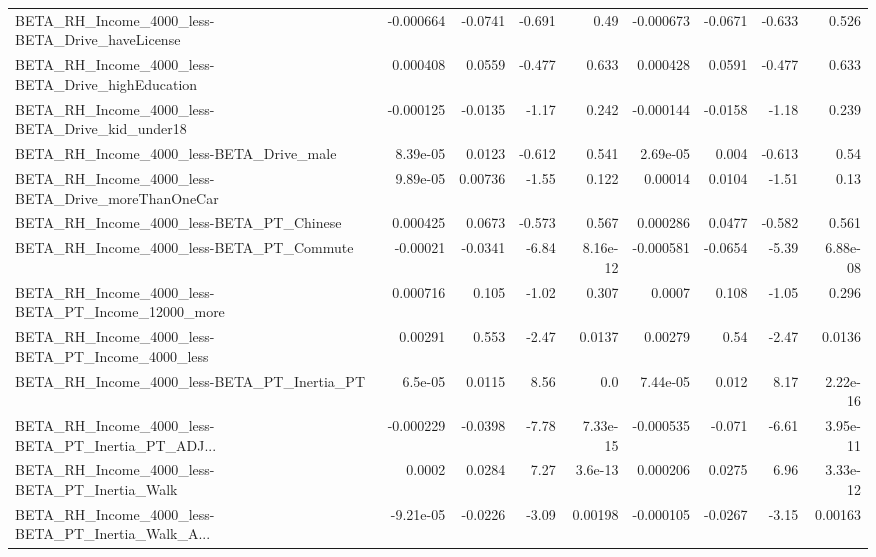 \begin{tabular}{lrrrrrrrr}
BETA\_RH\_Income\_4000\_less-BETA\_Drive\_haveLicense    &   -0.000664 &      -0.0741 &   -0.691 &     0.49 &  -0.000673 &     -0.0671 &       -0.633 &         0.526 \\
BETA\_RH\_Income\_4000\_less-BETA\_Drive\_highEducation  &    0.000408 &       0.0559 &   -0.477 &    0.633 &   0.000428 &      0.0591 &       -0.477 &         0.633 \\
BETA\_RH\_Income\_4000\_less-BETA\_Drive\_kid\_under18    &   -0.000125 &      -0.0135 &    -1.17 &    0.242 &  -0.000144 &     -0.0158 &        -1.18 &         0.239 \\
BETA\_RH\_Income\_4000\_less-BETA\_Drive\_male           &    8.39e-05 &       0.0123 &   -0.612 &    0.541 &   2.69e-05 &       0.004 &       -0.613 &          0.54 \\
BETA\_RH\_Income\_4000\_less-BETA\_Drive\_moreThanOneCar &    9.89e-05 &      0.00736 &    -1.55 &    0.122 &    0.00014 &      0.0104 &        -1.51 &          0.13 \\
BETA\_RH\_Income\_4000\_less-BETA\_PT\_Chinese           &    0.000425 &       0.0673 &   -0.573 &    0.567 &   0.000286 &      0.0477 &       -0.582 &         0.561 \\
BETA\_RH\_Income\_4000\_less-BETA\_PT\_Commute           &    -0.00021 &      -0.0341 &    -6.84 & 8.16e-12 &  -0.000581 &     -0.0654 &        -5.39 &      6.88e-08 \\
BETA\_RH\_Income\_4000\_less-BETA\_PT\_Income\_12000\_more &    0.000716 &        0.105 &    -1.02 &    0.307 &     0.0007 &       0.108 &        -1.05 &         0.296 \\
BETA\_RH\_Income\_4000\_less-BETA\_PT\_Income\_4000\_less  &     0.00291 &        0.553 &    -2.47 &   0.0137 &    0.00279 &        0.54 &        -2.47 &        0.0136 \\
BETA\_RH\_Income\_4000\_less-BETA\_PT\_Inertia\_PT        &     6.5e-05 &       0.0115 &     8.56 &      0.0 &   7.44e-05 &       0.012 &         8.17 &      2.22e-16 \\
BETA\_RH\_Income\_4000\_less-BETA\_PT\_Inertia\_PT\_ADJ... &   -0.000229 &      -0.0398 &    -7.78 & 7.33e-15 &  -0.000535 &      -0.071 &        -6.61 &      3.95e-11 \\
BETA\_RH\_Income\_4000\_less-BETA\_PT\_Inertia\_Walk      &      0.0002 &       0.0284 &     7.27 &  3.6e-13 &   0.000206 &      0.0275 &         6.96 &      3.33e-12 \\
BETA\_RH\_Income\_4000\_less-BETA\_PT\_Inertia\_Walk\_A... &   -9.21e-05 &      -0.0226 &    -3.09 &  0.00198 &  -0.000105 &     -0.0267 &        -3.15 &       0.00163 \\

\end{tabular}
